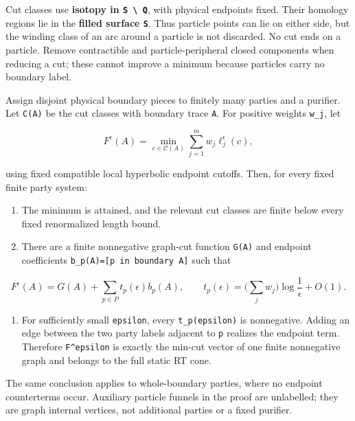 \documentclass[11pt]{article}
\providecommand{\tightlist}{\setlength{\itemsep}{1pt}\setlength{\parskip}{0pt}}
\begin{document}
Cut classes use \textbf{isotopy in \texttt{S\ \textbackslash{}\ Q}},
with physical endpoints fixed. Their homology regions lie in the
\textbf{filled surface \texttt{S}}. Thus particle points can lie on
either side, but the winding class of an arc around a particle is not
discarded. No cut ends on a particle. Remove contractible and
particle-peripheral closed components when reducing a cut; these cannot
improve a minimum because particles carry no boundary label.

Assign disjoint physical boundary pieces to finitely many parties and a
purifier. Let \texttt{C(A)} be the cut classes with boundary trace
\texttt{A}. For positive weights \texttt{w\_\allowbreak j}, let

\[
F^\epsilon(A)=\min_{c\in\mathcal C(A)}
  \sum_{j=1}^m w_j\ell_j^\epsilon(c),
\]

using fixed compatible local hyperbolic endpoint cutoffs. Then, for
every fixed finite party system:

\begin{enumerate}
\def\labelenumi{\arabic{enumi}.}
\tightlist
\item
  The minimum is attained, and the relevant cut classes are finite below
  every fixed renormalized length bound.
\item
  There are a finite nonnegative graph-cut function \texttt{G(A)} and
  endpoint coefficients \texttt{b\_\allowbreak p(A)={[}p\ in\ boundary\ A{]}} such
  that
\end{enumerate}

\[
F^\epsilon(A)=G(A)+\sum_{p\in P}t_p(\epsilon)b_p(A),
\qquad
t_p(\epsilon)=\Big(\sum_jw_j\Big)\log\frac1\epsilon+O(1).
\tag{1}
\]

\begin{enumerate}
\def\labelenumi{\arabic{enumi}.}
\setcounter{enumi}{2}
\tightlist
\item
  For sufficiently small \texttt{epsilon}, every \texttt{t\_\allowbreak p(epsilon)}
  is nonnegative. Adding an edge between the two party labels adjacent
  to \texttt{p} realizes the endpoint term. Therefore
  \texttt{F\^{}epsilon} is exactly the min-cut vector of one finite
  nonnegative graph and belongs to the full static RT cone.
\end{enumerate}

The same conclusion applies to whole-boundary parties, where no endpoint
counterterms occur. Auxiliary particle funnels in the proof are
unlabelled; they are graph internal vertices, not additional parties or
a fixed purifier.
\end{document}
